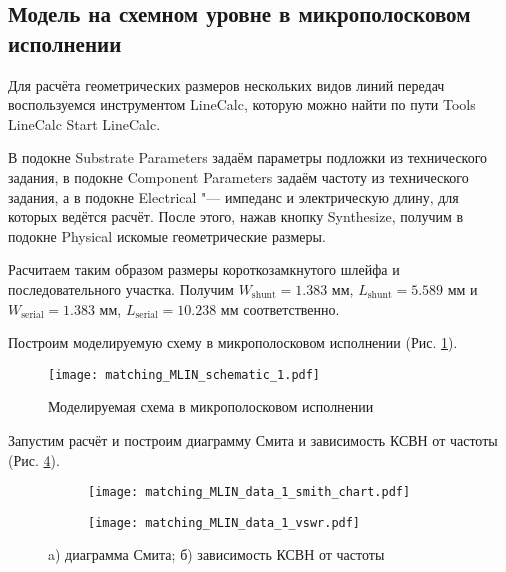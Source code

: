 \subsection{Модель на схемном уровне в микрополосковом исполнении}

Для расчёта геометрических размеров нескольких видов линий передач воспользуемся инструментом LineCalc, которую можно найти по пути Tools \textrightarrow LineCalc \textrightarrow Start LineCalc.

В подокне Substrate Parameters задаём параметры подложки из технического задания, в подокне Component Parameters задаём частоту из технического задания, а в подокне Electrical "--- импеданс и электрическую длину, для которых ведётся расчёт.
После этого, нажав кнопку Synthesize, получим в подокне Physical искомые геометрические размеры.

Расчитаем таким образом размеры короткозамкнутого шлейфа и последовательного участка.
Получим $W_\text{shunt} = 1.383 \text{~мм}$, $L_\text{shunt} = 5.589 \text{~мм}$ и $W_\text{serial} = 1.383 \text{~мм}$, $L_\text{serial} = 10.238 \text{~мм}$ соответственно.

Построим моделируемую схему в микрополосковом исполнении (Рис. \ref{fig:matching_MLIN_schematic_1}).

\begin{figure}[!ht]
    \centering
    \texttt{[image: matching\_MLIN\_schematic\_1.pdf]}
    \caption{Моделируемая схема в микрополосковом исполнении}
    \label{fig:matching_MLIN_schematic_1}
\end{figure}

Запустим расчёт и построим диаграмму Смита и зависимость КСВН от частоты (Рис. \ref{fig:matching_MLIN_data_display_1}).

\begin{figure}[!ht]
    \begin{subfigure}[b]{0.45\textwidth}
        \centering
        \texttt{[image: matching\_MLIN\_data\_1\_smith\_chart.pdf]}
        \caption{}
        \label{fig:matching_MLIN_data_1_smith_chart}
    \end{subfigure}
    \hfill
    \begin{subfigure}[b]{0.45\textwidth}
        \centering
        \texttt{[image: matching\_MLIN\_data\_1\_vswr.pdf]}
        \caption{}
        \label{fig:matching_MLIN_data_1_vswr}
    \end{subfigure}
    \caption{
        a) диаграмма Смита;
        б) зависимость КСВН от частоты
    }
    \label{fig:matching_MLIN_data_display_1}
\end{figure}

